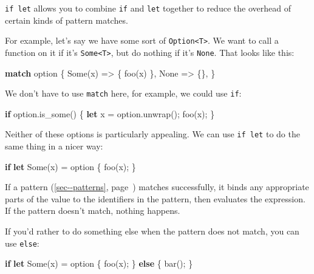 \documentclass[a4paper,]{book}
\renewcommand*{\hyperref}[2][\ar]{%
  \def\ar{#2}%
  #2 (\autoref{#1}, page~\pageref{#1})}
\newenvironment{Shaded}{\begin{snugshade}}{\end{snugshade}}
\newcommand{\KeywordTok}[1]{\textcolor[rgb]{0.13,0.29,0.53}{\textbf{{#1}}}}
\newcommand{\ConstantTok}[1]{\textcolor[rgb]{0.00,0.00,0.00}{{#1}}}
\newcommand{\NormalTok}[1]{{#1}}
\begin{document}
\texttt{if\ let} allows you to combine \texttt{if} and \texttt{let}
together to reduce the overhead of certain kinds of pattern matches.

For example, let's say we have some sort of
\texttt{Option\textless{}T\textgreater{}}. We want to call a function on
it if it's \texttt{Some\textless{}T\textgreater{}}, but do nothing if
it's \texttt{None}. That looks like this:

\begin{Shaded}
\begin{Highlighting}[]
\KeywordTok{match} \NormalTok{option \{}
    \ConstantTok{Some}\NormalTok{(x) => \{ foo(x) \},}
    \ConstantTok{None} \NormalTok{=> \{\},}
\NormalTok{\}}
\end{Highlighting}
\end{Shaded}

We don't have to use \texttt{match} here, for example, we could use
\texttt{if}:

\begin{Shaded}
\begin{Highlighting}[]
\KeywordTok{if} \NormalTok{option.is_some() \{}
    \KeywordTok{let} \NormalTok{x = option.unwrap();}
    \NormalTok{foo(x);}
\NormalTok{\}}
\end{Highlighting}
\end{Shaded}

Neither of these options is particularly appealing. We can use
\texttt{if\ let} to do the same thing in a nicer way:

\begin{Shaded}
\begin{Highlighting}[]
\KeywordTok{if} \KeywordTok{let} \ConstantTok{Some}\NormalTok{(x) = option \{}
    \NormalTok{foo(x);}
\NormalTok{\}}
\end{Highlighting}
\end{Shaded}

If a \hyperref[sec--patterns]{pattern} matches successfully, it binds
any appropriate parts of the value to the identifiers in the pattern,
then evaluates the expression. If the pattern doesn't match, nothing
happens.

If you'd rather to do something else when the pattern does not match,
you can use \texttt{else}:

\begin{Shaded}
\begin{Highlighting}[]
\KeywordTok{if} \KeywordTok{let} \ConstantTok{Some}\NormalTok{(x) = option \{}
    \NormalTok{foo(x);}
\NormalTok{\} }\KeywordTok{else} \NormalTok{\{}
    \NormalTok{bar();}
\NormalTok{\}}
\end{Highlighting}
\end{Shaded}
\end{document}
